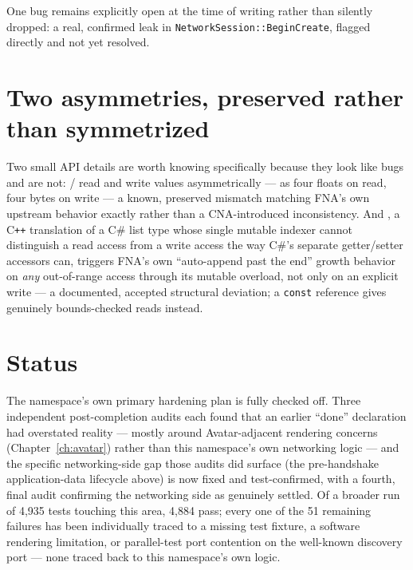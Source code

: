 One bug remains explicitly open at the time of writing rather than silently dropped: a real,
confirmed leak in \texttt{NetworkSession::BeginCreate}, flagged directly and not yet
resolved.

\section{Two asymmetries, preserved rather than symmetrized}

Two small API details are worth knowing specifically because they look like bugs and are
not: / read and write  values
asymmetrically --- as four floats on read, four bytes on write --- a known, preserved mismatch
matching FNA's own upstream behavior exactly rather than a CNA-introduced inconsistency. And
, a C\texttt{++} translation of a C\# list type whose
single mutable indexer cannot distinguish a read access from a write access the way C\#'s
separate getter/setter accessors can, triggers FNA's own ``auto-append past the end'' growth
behavior on \emph{any} out-of-range access through its mutable overload, not only on an
explicit write --- a documented, accepted structural deviation; a \texttt{const} reference
gives genuinely bounds-checked reads instead.

\section{Status}

The namespace's own primary hardening plan is fully checked off. Three independent
post-completion audits each found that an earlier ``done'' declaration had overstated
reality --- mostly around Avatar-adjacent rendering concerns (Chapter~\ref{ch:avatar}) rather
than this namespace's own networking logic --- and the specific networking-side gap those
audits did surface (the pre-handshake application-data lifecycle above) is now fixed and
test-confirmed, with a fourth, final audit confirming the networking side as genuinely
settled. Of a broader run of 4{,}935 tests touching this area, 4{,}884 pass; every one of the
51 remaining failures has been individually traced to a missing test fixture, a software
rendering limitation, or parallel-test port contention on the well-known discovery port ---
none traced back to this namespace's own logic.
